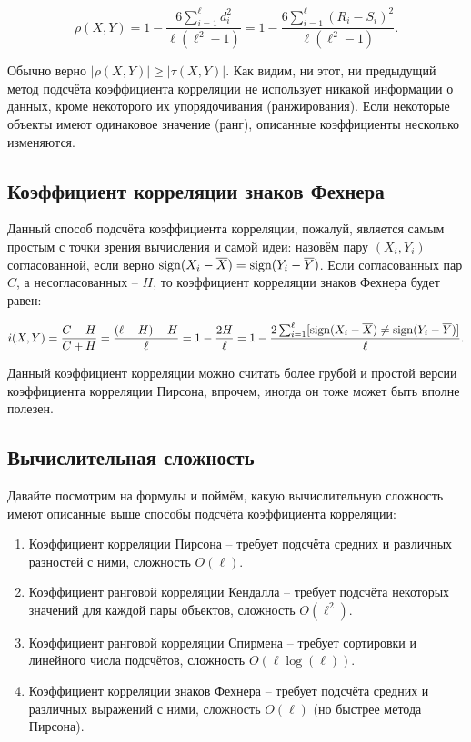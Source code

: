 \documentclass[12pt,fleqn]{article}
\begin{document}
	\[
	\rho(X, Y) =
	1 - \dfrac{6\sum_{i = 1}^{\ell}d_{i}^{2}}{\ell(\ell^{2} - 1)} =
	1 - \dfrac{6\sum_{i = 1}^{\ell}\left(R_{i} - S_{i}\right)^{2}}{\ell(\ell^{2} - 1)}.
	\]

	Обычно верно $ |\rho(X, Y)| \geqslant |\tau(X, Y)| $. Как видим, ни этот, ни предыдущий метод подсчёта коэффициента корреляции не использует никакой информации о данных, кроме некоторого их упорядочивания (ранжирования). Если некоторые объекты имеют одинаковое значение (ранг), описанные коэффициенты несколько изменяются.

	\subsection{Коэффициент корреляции знаков Фехнера}

	Данный способ подсчёта коэффициента корреляции, пожалуй, является самым простым с точки зрения вычисления и самой идеи: назовём пару $ (X_{i}, Y_{i}) $ согласованной, если верно $ \mathop{\rm sign}\limits(X_{i} - \overline{X}) = \mathop{\rm sign}\limits(Y_{i} - \overline{Y}) $. Если согласованных пар $ C $, а несогласованных – $ H $, то коэффициент корреляции знаков Фехнера будет равен:

	\[
	i(X, Y) = \dfrac{C - H}{C + H} = \dfrac{(\ell - H) - H}{\ell} = 1 - \dfrac{2H}{\ell} = 1 - \dfrac{2\sum_{i = 1}^{\ell}[\mathop{\rm sign}\limits(X_{i} - \overline{X}) \neq \mathop{\rm sign}\limits(Y_{i} - \overline{Y})]}{\ell}.
	\]

	Данный коэффициент корреляции можно считать более грубой и простой версии коэффициента корреляции Пирсона, впрочем, иногда он тоже может быть вполне полезен.

	\subsection{Вычислительная сложность}

	Давайте посмотрим на формулы и поймём, какую вычислительную сложность имеют описанные выше способы подсчёта коэффициента корреляции:

	\begin{enumerate}
		\item Коэффициент корреляции Пирсона – требует подсчёта средних и различных разностей с ними, сложность $ O(\ell) $.
		\item Коэффициент ранговой корреляции Кендалла – требует подсчёта некоторых значений для каждой пары объектов, сложность $ O(\ell^{2}) $.
		\item Коэффициент ранговой корреляции Спирмена – требует сортировки и линейного числа подсчётов, сложность $ O(\ell\log(\ell)) $.
		\item Коэффициент корреляции знаков Фехнера – требует подсчёта средних и различных выражений с ними, сложность $ O(\ell) $ (но быстрее метода Пирсона).
	\end{enumerate}
\end{document}
